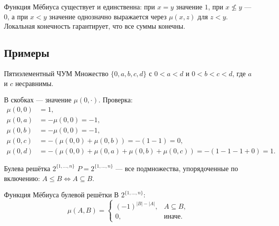 \begin{Remark}{}{}
	Функция Мёбиуса существует и единственна: при $x=y$ значение $1$, при $x\nleq y$ — $0$, а при $x<y$ значение однозначно выражается через $\mu(x,z)$ для $z<y$. Локальная конечность гарантирует, что все суммы конечны.
\end{Remark}

\subsection{Примеры}

\begin{Example}{Пятиэлементный ЧУМ}{}
	Множество $\{0,a,b,c,d\}$ с $0<a<d$ и $0<b<c<d$, где $a$ и $c$ несравнимы.

	\begin{center}
	\end{center}
	В скобках — значение $\mu(0,\cdot)$. Проверка:
	\begin{align*}
		\mu(0,0)&=1,\\
		\mu(0,a)&=-\mu(0,0)=-1,\\
		\mu(0,b)&=-\mu(0,0)=-1,\\
		\mu(0,c)&=-(\mu(0,0)+\mu(0,b))=-(1-1)=0,\\
		\mu(0,d)&=-(\mu(0,0)+\mu(0,a)+\mu(0,b)+\mu(0,c))=-(1-1-1+0)=1.
	\end{align*}
\end{Example}

\begin{Example}{Булева решётка $2^{\{1,\ldots,n\}}$}{}
	$P=2^{\{1,\ldots,n\}}$ — все подмножества, упорядоченные по включению: $A\le B\Leftrightarrow A\subseteq B$.
\end{Example}

\begin{Theorem}{Функция Мёбиуса булевой решётки}{}
	В $2^{\{1,\ldots,n\}}$:
	\[
	\mu(A,B)=
	\begin{cases}
		(-1)^{|B|-|A|}, & A\subseteq B,\\
		0, & \text{иначе.}
	\end{cases}
	\]
\end{Theorem}

